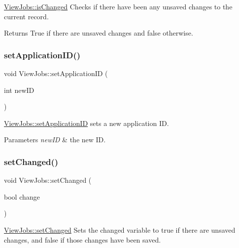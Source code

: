 \hyperlink{class_view_jobs_a5f75b45d28ce7f4a8050ce9ce0f44350}{View\+Jobs\+::is\+Changed} Checks if there have been any unsaved changes to the current record. 

\begin{DoxyReturn}{Returns}
True if there are unsaved changes and false otherwise. 
\end{DoxyReturn}
\mbox{\label{class_view_jobs_acd43a8c32ab9bca7e40ecc99e51da9b8}} 
\subsubsection{\texorpdfstring{set\+Application\+I\+D()}{setApplicationID()}}
{\footnotesize\ttfamily void View\+Jobs\+::set\+Application\+ID (\begin{DoxyParamCaption}\item[{int}]{new\+ID }\end{DoxyParamCaption})}



\hyperlink{class_view_jobs_acd43a8c32ab9bca7e40ecc99e51da9b8}{View\+Jobs\+::set\+Application\+ID} sets a new application ID. 


\begin{DoxyParams}{Parameters}
{\em new\+ID} & the new ID. \\
\hline
\end{DoxyParams}
\mbox{\label{class_view_jobs_a3cba868c6deadaf4b35c18982f7ec35e}} 
\subsubsection{\texorpdfstring{set\+Changed()}{setChanged()}}
{\footnotesize\ttfamily void View\+Jobs\+::set\+Changed (\begin{DoxyParamCaption}\item[{bool}]{change }\end{DoxyParamCaption})}



\hyperlink{class_view_jobs_a3cba868c6deadaf4b35c18982f7ec35e}{View\+Jobs\+::set\+Changed} Sets the changed variable to true if there are unsaved changes, and false if those changes have been saved. 


